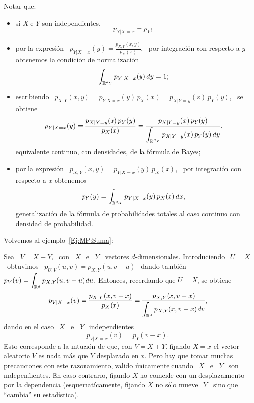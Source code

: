 Notar  que:
%
\begin{itemize}
\item si $X$ e $Y$ son independientes,
  \[
  p_{Y|X=x} = p_Y;
  \]
%
\item por  la expresi\'on \ $p_{Y|X=x}(y) =  \frac{p_{X,Y}(x,y)}{p_X(x)}$, \ por
  integraci\'on con respecto a $y$ obtenemos la condici\'on de normalizaci\'on
  \[
  \int_{\mathbb{R}^{d_Y}} p_{Y|X=x}(y) \, dy = 1;
  \]
%
\item escribiendo  \ $p_{X,Y}(x,y)  = p_{Y|X=x}(y) \,  p_X(x) =  p_{X|Y=y}(x) \,
  p_Y(y)$, \ se obtiene
  \[
  p_{Y|X=x}(y)   =  \frac{p_{X|Y=y}(x) \,   p_Y(y)}{p_X(x)}   =  \frac{p_{X|Y=y}(x)
    \, p_Y(y)}{\displaystyle \int_{\mathbb{R}^{d_Y}} p_{X|Y=y}(x) \, p_Y(y) \, dy},
  \]
  equivalente continuo, con densidades, de la f\'ormula de Bayes;
%
\item  por la  expresi\'on  \ $p_{X,Y}(x,y)  =  p_{Y|X=x}(y) \,  p_X(x)$, \  por
  integraci\'on con respecto a $x$ obtenemos
  \[
  p_Y(y) = \int_{\mathbb{R}^{d_X}} p_{Y|X=x}(y) \, p_X(x) \, dx,
  \]
  generalizaci\'on de la f\'ormula de  probabilidades totales al caso continuo con
  densidad de probabilidad.
\end{itemize}

Volvemos al ejemplo~\ref{Ej:MP:Suma}:
%
\begin{ejemplo}
\label{Ej:MP:SumaCond}
%
  Sea   \   $V  =   X   +   Y$,  \   con   \   $X$  \   e   \   $Y$  \   vectores
  $d$-dimensionales.  Introduciendo \  $U =  X$  \ obtuvimos  \ $p_{U,V}(u,v)  =
  p_{X,Y}(u,v-u)$  \ dando  tambi\'en \  $\displaystyle p_V(v)  = \int_{\mathbb{R}^d}
  p_{X,Y}(u,v-u) \, du$. Entonces, recordando que $U = X$, se obtiene
  \[
  p_{V|X=x}(v)            =            \frac{p_{X,Y}(x,v-x)}{p_X(x)}           =
  \frac{p_{X,Y}(x,v-x)}{\displaystyle \int_{\mathbb{R}^d} p_{X,Y}(x,v-x) \, dv},
  \]
  dando en el caso \ $X$ \ e \ $Y$ \ independientes
  \[
  p_{V|X=x}(v) = p_Y(v-x).
  \]
  Esto corresponde a la  intuci\'on de que, con $V = X + Y$,  fijando $X = x$ el
  vector aleatorio  $V$ es nada  m\'as que $Y$  desplazado en $x$. Pero  hay que
  tomar muchas precauciones con  este razonamiento, valido \'unicamente cuando \
  $X$  \ e  \  $Y$ \  son independientes.   En  caso contrario,  fijando $X$  no
  coincide con un desplazamiento por la dependencia (esquemat\'icamente, fijando
  $X$ no s\'olo mueve \ $Y$ \ sino que ``cambia'' su estad\'istica).
\end{ejemplo}
